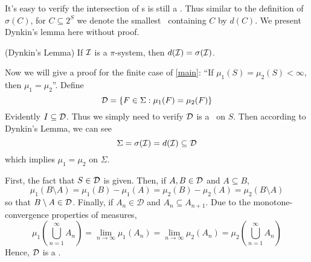    It's easy to verify the intersection of {\ds}s is still a \ds. Thus similar to the definition of $\sigma(C)$, for $C \subseteq 2^S$ we denote the smallest \ds\ containing $C$ by $d(C)$.  We present Dynkin's lemma here without proof.
\begin{lemma}
    (Dynkin's Lemma) If $\mathcal{I}$ is a $\pi$-system, then $d(\mathcal{I}) = \sigma(\mathcal{I})$.
\end{lemma}

Now we will give a proof for the finite case of \cref{main}: ``If $\mu_1(S) = \mu_2(S) < \infty$, then $\mu_1 = \mu_2$''. Define
\[ \mathcal{D} = \{F \in \Sigma : \mu_1(F) = \mu_2(F)\} \]
Evidently $I \subseteq \mathcal{D}$. Thus we simply need to verify $\mathcal{D}$ is a \ds\ on $S$. Then according to Dynkin's Lemma, we can see 
\[ \Sigma = \sigma(\mathcal{I}) = d(\mathcal{I}) \subseteq \mathcal{D}\]
which implies $\mu_1 = \mu_2$ on $\Sigma$.
 
First, the fact that $S \in \mathcal{D}$ is given. Then, if $A, B \in \mathcal{D}$ and $A \subseteq B$,  
\begin{equation}
    \label{t}
    \mu_1(B \setminus A) = \mu_1(B) - \mu_1(A) = \mu_2(B) - \mu_2(A) = \mu_2(B \setminus A)
\end{equation}
so that $B \setminus A \in \mathcal{D}$. Finally, if $A_n \in \mathcal{D}$ and $A_n \subseteq A_{n+1}$. Due to the monotone-convergence properties of measures, 
\[\mu_1(\bigcup _{n=1}^{\infty }A_{n}) = \lim_{n \to \infty}\mu_1(A_n) = \lim_{n \to \infty}\mu_2(A_n) = \mu_2(\bigcup _{n=1}^{\infty }A_{n})\] 
Hence, $\mathcal{D}$ is a \ds.

